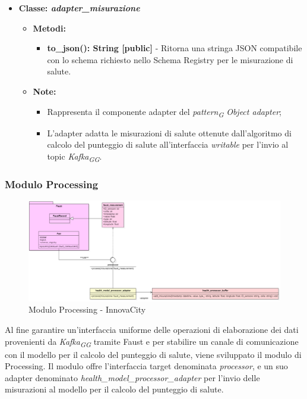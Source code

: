 \begin{itemize}
\begin{itemize}
\begin{itemize}
        \end{itemize}
    \end{itemize}
    \item{\textbf{Classe: \textit{adapter\_misurazione}}}
    \begin{itemize}
        \item \textbf{Metodi: }
        \begin{itemize}
            \item \textbf{to\_json(): String [public]} - Ritorna una stringa JSON compatibile con lo schema richiesto nello Schema Registry per le misurazione di salute.
        \end{itemize}
        \item\textbf{Note:}
        \begin{itemize}
            \item Rappresenta il componente adapter del \textit{pattern}\textsubscript{\textit{G}} \textit{Object adapter};
            \item L'adapter adatta le misurazioni di salute ottenute dall'algoritmo di calcolo del punteggio di salute all'interfaccia \textit{writable} per l'invio al topic \textit{Kafka}\textsubscript{\textit{G}}\textsubscript{\textit{G}}.
        \end{itemize}
    \end{itemize}
\end{itemize}

\subsubsection{Modulo Processing}
\begin{figure}[H]
    \centering
    \includegraphics[width=1\textwidth]{../Images/SpecificaTecnica/processorFaust.PNG}
    \caption{Modulo Processing - InnovaCity}
    \label{fig: processHealth}
\end{figure}
Al fine garantire un'interfaccia uniforme delle operazioni di elaborazione dei dati provenienti da \textit{Kafka}\textsubscript{\textit{G}}\textsubscript{\textit{G}} tramite Faust e per stabilire un canale di comunicazione con il modello per il calcolo del punteggio di salute, viene sviluppato il modulo di Processing. Il modulo offre l'interfaccia target denominata \textit{processor}, e un suo adapter denominato \textit{health\_model\_processor\_adapter} per l'invio delle misurazioni al modello per il calcolo del punteggio di salute.

